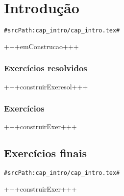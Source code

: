
\chapter{Introdução}
\verb+#srcPath:cap_intro/cap_intro.tex#+
\label{chap:introducao}

+++emConstrucao+++

\subsection*{Exercícios resolvidos}

+++construirExeresol+++

\subsection*{Exercícios}

+++construirExer+++

\section{Exercícios finais}
\verb+#srcPath:cap_intro/cap_intro.tex#+


+++construirExer+++

